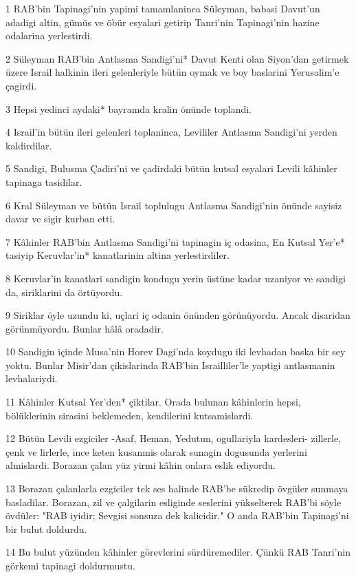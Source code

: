 \par 1 RAB'bin Tapinagi'nin yapimi tamamlaninca Süleyman, babasi Davut'un adadigi altin, gümüs ve öbür esyalari getirip Tanri'nin Tapinagi'nin hazine odalarina yerlestirdi.
\par 2 Süleyman RAB'bin Antlasma Sandigi'ni* Davut Kenti olan Siyon'dan getirmek üzere Israil halkinin ileri gelenleriyle bütün oymak ve boy baslarini Yerusalim'e çagirdi.
\par 3 Hepsi yedinci aydaki* bayramda kralin önünde toplandi.
\par 4 Israil'in bütün ileri gelenleri toplaninca, Levililer Antlasma Sandigi'ni yerden kaldirdilar.
\par 5 Sandigi, Bulusma Çadiri'ni ve çadirdaki bütün kutsal esyalari Levili kâhinler tapinaga tasidilar.
\par 6 Kral Süleyman ve bütün Israil toplulugu Antlasma Sandigi'nin önünde sayisiz davar ve sigir kurban etti.
\par 7 Kâhinler RAB'bin Antlasma Sandigi'ni tapinagin iç odasina, En Kutsal Yer'e* tasiyip Keruvlar'in* kanatlarinin altina yerlestirdiler.
\par 8 Keruvlar'in kanatlari sandigin kondugu yerin üstüne kadar uzaniyor ve sandigi da, siriklarini da örtüyordu.
\par 9 Siriklar öyle uzundu ki, uçlari iç odanin önünden görünüyordu. Ancak disaridan görünmüyordu. Bunlar hâlâ oradadir.
\par 10 Sandigin içinde Musa'nin Horev Dagi'nda koydugu iki levhadan baska bir sey yoktu. Bunlar Misir'dan çikislarinda RAB'bin Israilliler'le yaptigi antlasmanin levhalariydi.
\par 11 Kâhinler Kutsal Yer'den* çiktilar. Orada bulunan kâhinlerin hepsi, bölüklerinin sirasini beklemeden, kendilerini kutsamislardi.
\par 12 Bütün Levili ezgiciler -Asaf, Heman, Yedutun, ogullariyla kardesleri- zillerle, çenk ve lirlerle, ince keten kusanmis olarak sunagin dogusunda yerlerini almislardi. Borazan çalan yüz yirmi kâhin onlara eslik ediyordu.
\par 13 Borazan çalanlarla ezgiciler tek ses halinde RAB'be sükredip övgüler sunmaya basladilar. Borazan, zil ve çalgilarin esliginde seslerini yükselterek RAB'bi söyle övdüler: "RAB iyidir; Sevgisi sonsuza dek kalicidir." O anda RAB'bin Tapinagi'ni bir bulut doldurdu.
\par 14 Bu bulut yüzünden kâhinler görevlerini sürdüremediler. Çünkü RAB Tanri'nin görkemi tapinagi doldurmustu.

